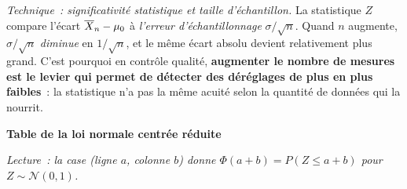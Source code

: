 \begin{enumerate}
{\begin{solution}
      \medskip

      \textit{Technique~: significativité statistique et taille d'échantillon.} La statistique $Z$ compare l'écart $\overline{X}_n - \mu_0$ à \emph{l'erreur d'échantillonnage} $\sigma/\sqrt{n}$. Quand $n$ augmente, $\sigma/\sqrt{n}$ \emph{diminue} en $1/\sqrt{n}$, et le même écart absolu devient relativement plus grand. C'est pourquoi en contrôle qualité, \textbf{augmenter le nombre de mesures est le levier qui permet de détecter des déréglages de plus en plus faibles}~: la statistique n'a pas la même \og acuité \fg{} selon la quantité de données qui la nourrit.
    \end{solution}
  }{}

\end{enumerate}

\newpage

\begin{center}\large\textbf{Table de la loi normale centrée réduite}\end{center}

\vspace{-0.1cm}

\noindent\textit{\small Lecture~: la case (ligne $a$, colonne $b$) donne $\Phi(a + b) = P(Z \le a + b)$ pour $Z \sim \mathcal{N}(0,1)$.}

\vspace{0.2cm}

